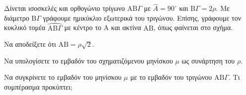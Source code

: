 Δίνεται ισοσκελές και ορθογώνιο τρίγωνο \(\text{AB}\Gamma\) με \(\hat{A} = 90^\circ\) και \(\text{B}\Gamma = 2\rho\). Με διάμετρο \(\text{B}\Gamma\) γράφουμε ημικύκλιο εξωτερικά του τριγώνου. Επίσης, γράφουμε τον κυκλικό τομέα \(\wideparen{\text{AB}\Gamma}\) με κέντρο το Α και ακτίνα \(\text{AB}\), όπως φαίνεται στο σχήμα.
\begin{alist}
\item Να αποδείξετε ότι \(\text{AB} = \rho\sqrt{2}\). 
\item Να υπολογίσετε το εμβαδόν του σχηματιζόμενου μηνίσκου \(\mu\) ως συνάρτηση του \(\rho\). 
\item Να συγκρίνετε το εμβαδόν του μηνίσκου \(\mu\) με το εμβαδόν του τριγώνου \(\text{AB}\Gamma\). Τι συμπέρασμα προκύπτει; 
\end{alist}